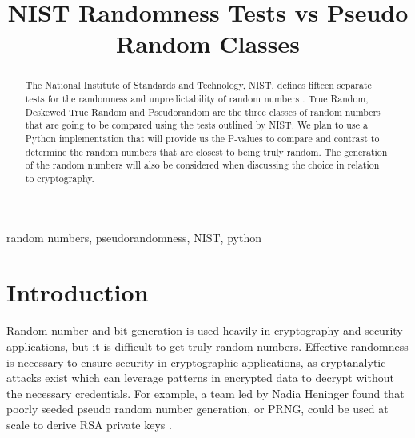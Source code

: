 \documentclass[11pt,letterpaper,conference]{IEEEtran}
\begin{document}
\title{NIST Randomness Tests vs Pseudo Random Classes}

\author{
\and
{}
\and
{}
\and
{}
\and
{}
\and
{}
}

\maketitle

\begin{abstract}
The National Institute of Standards and Technology, NIST, defines fifteen separate tests
for the randomness and unpredictability of random numbers \cite{nistbook}. True Random, Deskewed True
Random and Pseudorandom are the three classes of random numbers that are going to be
compared using the tests outlined by NIST. We plan to use a Python implementation that will
provide us the P-values to compare and contrast to determine the random numbers that are
closest to being truly random. The generation of the random numbers will also be considered
when discussing the choice in relation to cryptography.
\end{abstract}

\begin{IEEEkeywords}
random numbers, pseudorandomness, NIST, python
\end{IEEEkeywords}

\section{Introduction}
Random number and bit generation is used heavily in cryptography and security applications, but it
is difficult to get truly random numbers. Effective randomness is necessary to ensure security in
cryptographic applications, as cryptanalytic attacks exist which can leverage patterns in encrypted
data to decrypt without the necessary credentials. For example, a team led by Nadia Heninger found
that poorly seeded pseudo random number generation, or PRNG, could be used at scale to derive RSA
private keys \cite{heninger2012mining}.
\end{document}
